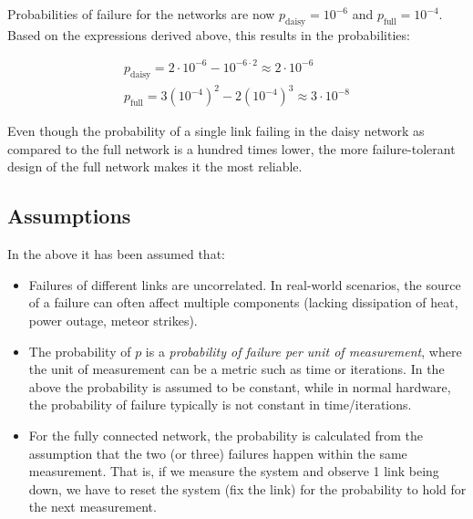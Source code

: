 \documentclass[12pt]{article}
\begin{document}
Probabilities of failure for the networks are now $p_{\text{daisy}} = 10^{-6}$ and $p_{\text{full}} = 10^{-4}$. \\
Based on the expressions derived above, this results in the probabilities:

\begin{align*}
  p_{\text{daisy}} = 2\cdot10^{-6} - 10^{-6\cdot2} \approx 2\cdot10^{-6} \\
  p_{\text{full}} = 3(10^{-4})^2 - 2(10^{-4})^3 \approx 3\cdot10^{-8}
\end{align*}

Even though the probability of a single link failing in the daisy network as compared to the full network is a hundred times lower, the more failure-tolerant design of the full network makes it the most reliable.

\subsection*{Assumptions}

In the above it has been assumed that:
\begin{itemize}
  \item Failures of different links are uncorrelated. In real-world scenarios, the source of a failure can often affect multiple components (lacking dissipation of heat, power outage, meteor strikes).
  \item The probability of $p$ is a \emph{probability of failure per unit of measurement}, where the unit of measurement can be a metric such as time or iterations. In the above the probability is assumed to be constant, while in normal hardware, the probability of failure typically is not constant in time/iterations.
  \item For the fully connected network, the probability is calculated from the assumption that the two (or three) failures happen within the same measurement. That is, if we measure the system and observe 1 link being down, we have to reset the system (fix the link) for the probability to hold for the next measurement.
\end{itemize}
\end{document}
